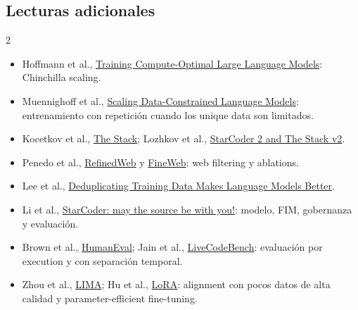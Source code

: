 \documentclass[a4paper]{article}
\begin{document}
\subsection{Lecturas adicionales}

\begin{multicols}{2}
\footnotesize
\begin{itemize}
  \setlength{\itemsep}{0.15em}
  \item Hoffmann et al., \href{https://arxiv.org/abs/2203.15556}{Training Compute-Optimal Large Language Models}: Chinchilla scaling.
  \item Muennighoff et al., \href{https://arxiv.org/abs/2305.16264}{Scaling Data-Constrained Language Models}: entrenamiento con repetición cuando los unique data son limitados.
  \item Kocetkov et al., \href{https://arxiv.org/abs/2211.15533}{The Stack}; Lozhkov et al., \href{https://arxiv.org/abs/2402.19173}{StarCoder 2 and The Stack v2}.
  \item Penedo et al., \href{https://arxiv.org/abs/2306.01116}{RefinedWeb} y \href{https://arxiv.org/abs/2406.17557}{FineWeb}: web filtering y ablations.
  \item Lee et al., \href{https://arxiv.org/abs/2107.06499}{Deduplicating Training Data Makes Language Models Better}.
  \item Li et al., \href{https://arxiv.org/abs/2305.06161}{StarCoder: may the source be with you!}: modelo, FIM, gobernanza y evaluación.
  \item Brown et al., \href{https://arxiv.org/abs/2107.03374}{HumanEval}; Jain et al., \href{https://arxiv.org/abs/2403.07974}{LiveCodeBench}: evaluación por execution y con separación temporal.
  \item Zhou et al., \href{https://arxiv.org/abs/2305.11206}{LIMA}; Hu et al., \href{https://arxiv.org/abs/2106.09685}{LoRA}: alignment con pocos datos de alta calidad y parameter-efficient fine-tuning.
\end{itemize}
\end{multicols}
\end{document}
